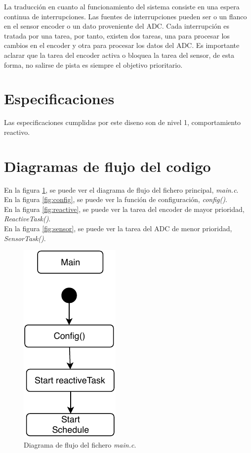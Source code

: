 \documentclass[conference]{IEEEtran}
\begin{document}
La traducción en cuanto al funcionamiento del sistema consiste en una espera continua de interrupciones. Las fuentes de interrupciones pueden ser o un flanco en el sensor encoder o un dato proveniente del ADC. Cada interrupción es tratada por una tarea, por tanto, existen dos tareas, una para procesar los cambios en el encoder y otra para procesar los datos del ADC. Es importante aclarar que la tarea del encoder activa o bloquea la tarea del sensor, de esta forma, no salirse de pista es siempre el objetivo prioritario.

\section{\large{Especificaciones}}
Las especificaciones cumplidas por este diseno son de nivel 1, comportamiento reactivo.

\section{\large{Diagramas de flujo del codigo}}
En la figura \ref{fig:main}, se puede ver el diagrama de flujo del fichero principal, \textit{main.c}.\\

En la figura \ref{fig:config}, se puede ver la función de configuración, \textit{config()}.\\

En la figura \ref{fig:reactive}, se puede ver la tarea del encoder de mayor prioridad, \textit{ReactiveTask()}.\\

En la figura \ref{fig:sensor}, se puede ver la tarea del ADC de menor prioridad, \textit{SensorTask()}.\\

\begin{figure}[h]
    \centering
    \includegraphics[width=0.4\linewidth]{photos/main.pdf}
    \caption{\large{Diagrama de flujo del fichero \textit{main.c}.}}
    \label{fig:main}
\end{figure}
\end{document}
